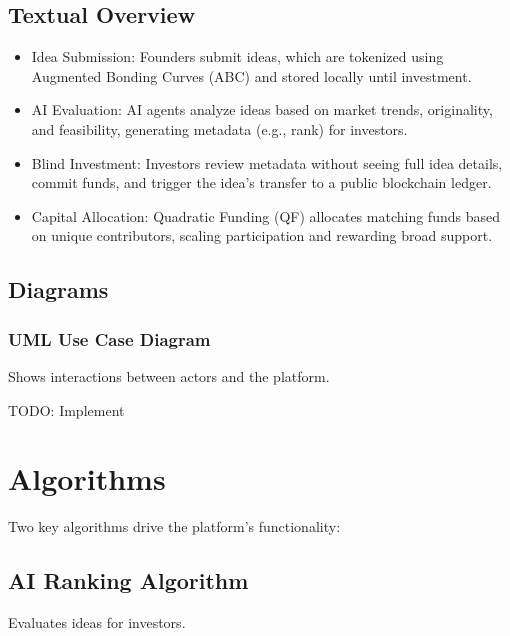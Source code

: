 \documentclass[12pt]{article}
\begin{document}
\subsection{Textual Overview}
\begin{itemize}
    \item Idea Submission: Founders submit ideas, which are tokenized using Augmented Bonding Curves (ABC) and stored locally until investment.
    \item AI Evaluation: AI agents analyze ideas based on market trends, originality, and feasibility, generating metadata (e.g., rank) for investors.
    \item Blind Investment: Investors review metadata without seeing full idea details, commit funds, and trigger the idea's transfer to a public blockchain ledger.
    \item Capital Allocation: Quadratic Funding (QF) allocates matching funds based on unique contributors, scaling participation and rewarding broad support.
\end{itemize}

\subsection{Diagrams}

\subsubsection{UML Use Case Diagram}
Shows interactions between actors and the platform.

TODO: Implement

\section{Algorithms}

Two key algorithms drive the platform's functionality:

\subsection{AI Ranking Algorithm}
Evaluates ideas for investors.
\end{document}
